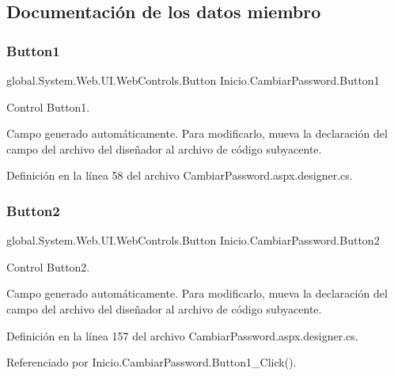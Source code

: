 \subsection{Documentación de los datos miembro}
\mbox{\label{classInicio_1_1CambiarPassword_a1fb3744d75ceb088b1368122d0007cee}} 
\subsubsection{\texorpdfstring{Button1}{Button1}}
{\footnotesize\ttfamily global.\+System.\+Web.\+U\+I.\+Web\+Controls.\+Button Inicio.\+Cambiar\+Password.\+Button1\hspace{0.3cm}{\ttfamily [protected]}}



Control Button1. 

Campo generado automáticamente. Para modificarlo, mueva la declaración del campo del archivo del diseñador al archivo de código subyacente. 

Definición en la línea 58 del archivo Cambiar\+Password.\+aspx.\+designer.\+cs.

\mbox{\label{classInicio_1_1CambiarPassword_ab2a855fe05cc706ac07c6308af3dcc54}} 
\subsubsection{\texorpdfstring{Button2}{Button2}}
{\footnotesize\ttfamily global.\+System.\+Web.\+U\+I.\+Web\+Controls.\+Button Inicio.\+Cambiar\+Password.\+Button2\hspace{0.3cm}{\ttfamily [protected]}}



Control Button2. 

Campo generado automáticamente. Para modificarlo, mueva la declaración del campo del archivo del diseñador al archivo de código subyacente. 

Definición en la línea 157 del archivo Cambiar\+Password.\+aspx.\+designer.\+cs.



Referenciado por Inicio.\+Cambiar\+Password.\+Button1\+\_\+\+Click().

